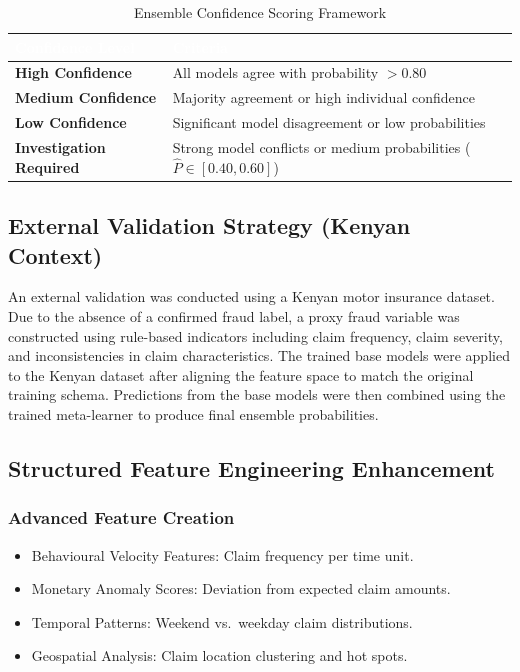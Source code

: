 \documentclass[12pt,a4paper,oneside]{report}
\numberwithin{equation}{chapter}
\renewcommand{\arraystretch}{1.6}
\begin{document}
\begin{table}[H]
\centering
\caption{Ensemble Confidence Scoring Framework}
\label{tab:confidence_scoring}
\renewcommand{\arraystretch}{1.4}
\begin{tabular}{L{4cm} L{8cm}}
\toprule
{}
\textcolor{white}{\textbf{Confidence Level}} &
\textcolor{white}{\textbf{Criteria}} \\
\midrule
{}
\textbf{High Confidence} & All models agree with probability $> 0.80$ \\
\textbf{Medium Confidence} & Majority agreement or high individual confidence \\
\textbf{Low Confidence} & Significant model disagreement or low probabilities \\
\textbf{Investigation Required} & Strong model conflicts or medium probabilities ($\hat{P} \in [0.40, 0.60]$) \\
\bottomrule
\end{tabular}
\end{table}

\subsection{External Validation Strategy (Kenyan Context)}

An external validation was conducted using a Kenyan motor insurance dataset. Due to the absence of
a confirmed fraud label, a proxy fraud variable was constructed using rule-based indicators
including claim frequency, claim severity, and inconsistencies in claim characteristics. The
trained base models were applied to the Kenyan dataset after aligning the feature space to match
the original training schema. Predictions from the base models were then combined using the
trained meta-learner to produce final ensemble probabilities.

\subsection{Structured Feature Engineering Enhancement}
\label{subsec:structured-feature-enhancement}

\subsubsection{Advanced Feature Creation}

\begin{itemize}
    \item Behavioural Velocity Features: Claim frequency per time unit.
    \item Monetary Anomaly Scores: Deviation from expected claim amounts.
    \item Temporal Patterns: Weekend vs.\ weekday claim distributions.
    \item Geospatial Analysis: Claim location clustering and hot spots.
\end{itemize}
\end{document}
